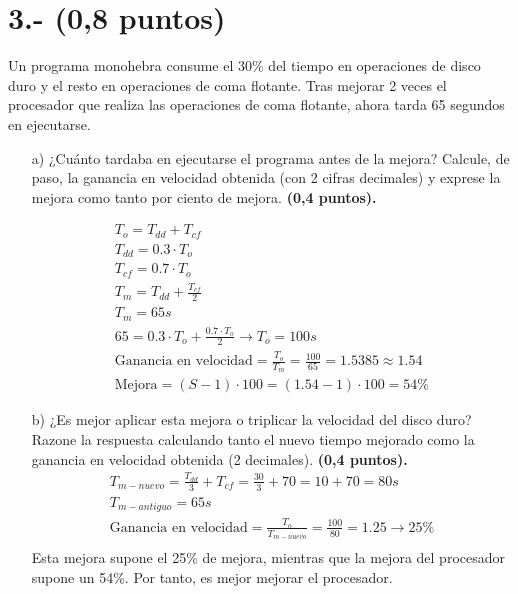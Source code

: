 \documentclass[a4paper,12pt]{article}
\begin{document}
\section*{3.- (0,8 puntos)}
Un programa monohebra consume el 30\% del tiempo en operaciones de disco duro y el resto en operaciones de coma flotante. Tras mejorar 2 veces el procesador que realiza las operaciones de coma flotante, ahora tarda 65 segundos en ejecutarse.

\begin{enumerate}
    \item[a)] ¿Cuánto tardaba en ejecutarse el programa antes de la mejora? Calcule, de paso, la ganancia en velocidad obtenida (con 2 cifras decimales) y exprese la mejora como tanto por ciento de mejora. \textbf{(0,4 puntos).}
    
    \begin{align*}
        T_o = T_{dd} + T_{cf}\\
        T_{dd} = 0.3 \cdot T_o\\
        T_{cf} = 0.7 \cdot T_o\\
        T_m = T_{dd} + \frac{T_{cf}}{2}\\
        T_m = 65s\\
        65 = 0.3 \cdot T_o + \frac{0.7 \cdot T_o}{2} \rightarrow T_o = 100s\\
        \text{Ganancia en velocidad} = \frac{T_o}{T_m} = \frac{100}{65} =  1.5385 \approx 1.54\\
        \text{Mejora} = (S-1) \cdot 100 = (1.54 - 1) \cdot 100 = 54\%
    \end{align*}


    \item[b)] ¿Es mejor aplicar esta mejora o triplicar la velocidad del disco duro? Razone la respuesta calculando tanto el nuevo tiempo mejorado como la ganancia en velocidad obtenida (2 decimales). \textbf{(0,4 puntos).}
    \begin{align*}
        T_{m-nuevo} = \frac{T_{dd}}{3} + T_{cf} = \frac{30}{3} + 70 = 10 + 70 = 80s\\
        T_{m-antiguo} = 65s\\
        \text{Ganancia en velocidad} = \frac{T_o}{T_{m-nuevo}} = \frac{100}{80} = 1.25 \rightarrow 25\%\\
    \end{align*}
    Esta mejora supone el 25\% de mejora, mientras que la mejora del procesador supone un 54\%. Por tanto, es mejor mejorar el procesador.
    


\end{enumerate}
\end{document}

